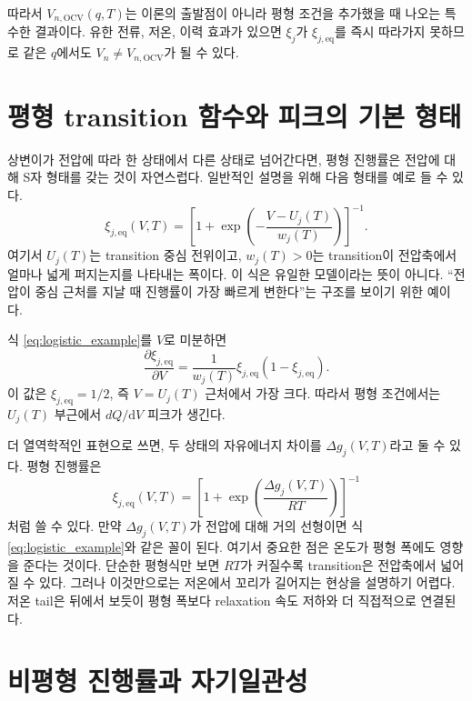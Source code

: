 \documentclass[11pt,a4paper]{article}
\newcommand{\dd}{\mathrm{d}}
\newcommand{\eqs}{\mathrm{eq}}
\newcommand{\OCV}{\mathrm{OCV}}
\begin{document}
따라서 \(V_{n,\OCV}(q,T)\)는 이론의 출발점이 아니라 평형 조건을 추가했을 때 나오는 특수한 결과이다. 유한 전류, 저온, 이력 효과가 있으면 \(\xi_j\)가 \(\xi_{j,\eqs}\)를 즉시 따라가지 못하므로 같은 \(q\)에서도 \(V_n\neq V_{n,\OCV}\)가 될 수 있다.

\section{평형 transition 함수와 피크의 기본 형태}

상변이가 전압에 따라 한 상태에서 다른 상태로 넘어간다면, 평형 진행률은 전압에 대해 S자 형태를 갖는 것이 자연스럽다. 일반적인 설명을 위해 다음 형태를 예로 들 수 있다.
\begin{equation}
\xi_{j,\eqs}(V,T)
=
\left[
1+\exp\left(
-\frac{V-U_j(T)}{w_j(T)}
\right)
\right]^{-1}.
\label{eq:logistic_example}
\end{equation}
여기서 \(U_j(T)\)는 transition 중심 전위이고, \(w_j(T)>0\)는 transition이 전압축에서 얼마나 넓게 퍼지는지를 나타내는 폭이다. 이 식은 유일한 모델이라는 뜻이 아니다. ``전압이 중심 근처를 지날 때 진행률이 가장 빠르게 변한다''는 구조를 보이기 위한 예이다.

식 \eqref{eq:logistic_example}를 \(V\)로 미분하면
\begin{equation}
\frac{\partial \xi_{j,\eqs}}{\partial V}
=
\frac{1}{w_j(T)}
\xi_{j,\eqs}(1-\xi_{j,\eqs}).
\label{eq:logistic_derivative}
\end{equation}
이 값은 \(\xi_{j,\eqs}=1/2\), 즉 \(V=U_j(T)\) 근처에서 가장 크다. 따라서 평형 조건에서는 \(U_j(T)\) 부근에서 \(dQ/\dd V\) 피크가 생긴다.

더 열역학적인 표현으로 쓰면, 두 상태의 자유에너지 차이를 \(\Delta g_j(V,T)\)라고 둘 수 있다. 평형 진행률은
\begin{equation}
\xi_{j,\eqs}(V,T)
=
\left[
1+\exp\left(\frac{\Delta g_j(V,T)}{RT}\right)
\right]^{-1}
\label{eq:free_energy_occupancy}
\end{equation}
처럼 쓸 수 있다. 만약 \(\Delta g_j(V,T)\)가 전압에 대해 거의 선형이면 식 \eqref{eq:logistic_example}와 같은 꼴이 된다. 여기서 중요한 점은 온도가 평형 폭에도 영향을 준다는 것이다. 단순한 평형식만 보면 \(RT\)가 커질수록 transition은 전압축에서 넓어질 수 있다. 그러나 이것만으로는 저온에서 꼬리가 길어지는 현상을 설명하기 어렵다. 저온 tail은 뒤에서 보듯이 평형 폭보다 relaxation 속도 저하와 더 직접적으로 연결된다.

\section{비평형 진행률과 자기일관성}
\end{document}
